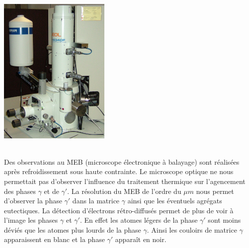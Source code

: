 \centerline{\includegraphics[width=0.4\textwidth]{images/JEOL_JSM-6340F.jpg}}
\\
Des observations au MEB (microscope électronique à balayage) sont réalisées après refroidissement sous haute contrainte. Le microscope optique ne nous permettait pas d'observer l'influence du traitement thermique sur l'agencement des phases $\gamma$ et de $\gamma'$. La résolution du MEB de l'ordre du $\mu m$ nous permet d'observer la phase $\gamma'$ dans la matrice $\gamma$ ainsi que les éventuels agrégats eutectiques. La détection d'électrons rétro-diffusés permet de plus de voir à l'image les phases $\gamma$ et $\gamma'$. En effet les atomes légers de la phase $\gamma'$ sont moins déviés que les atomes plus lourds de la phase $\gamma$. Ainsi les couloirs de matrice $\gamma$ apparaissent en blanc et la phase $\gamma'$ apparaît en noir.
\newpage


